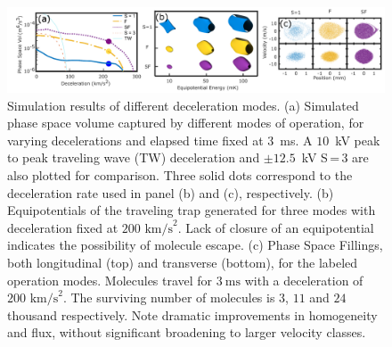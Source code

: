 \documentclass[%
 reprint,
 amsmath,amssymb,
 aps,
prl,
]{revtex4-1}
\begin{document}
\begin{figure}[t]
\includegraphics[width=\linewidth]{Figure2.png}%
\vspace{-2mm}
\caption{
Simulation results of different deceleration modes. 
(a) Simulated phase space volume captured by different modes of operation, for varying decelerations and elapsed time fixed at $3$~ms. 
A $10$~kV peak to peak traveling wave (TW) deceleration and $\pm 12.5$~kV S\,=\,3 are also plotted for comparison. 
Three solid dots correspond to the deceleration rate used in panel (b) and (c), respectively. 
(b) Equipotentials of the traveling trap generated for three modes with deceleration fixed at $200 \text{ km/s}^2$. 
Lack of closure of an equipotential indicates the possibility of molecule escape. 
(c) Phase Space Fillings, both longitudinal (top) and transverse (bottom), for the labeled operation modes.
Molecules travel for $3~\text{ms}$ with a deceleration of $200 \text{ km/s}^2$. 
The surviving number of molecules is $3$, $11$ and $24$ thousand respectively. 
Note dramatic improvements in homogeneity and flux, without significant broadening to larger velocity classes.
\vspace{-4mm}}
\label{fig:efftrap}
\end{figure}
\end{document}
